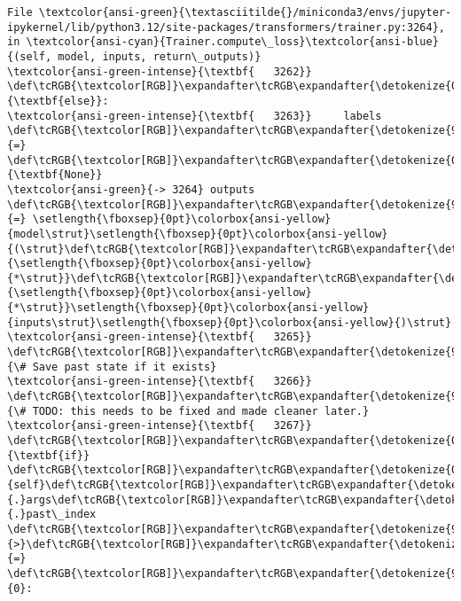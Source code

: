 \documentclass[11pt]{article}
\begin{document}
\begin{Verbatim}[commandchars=\\\{\}, frame=single, framerule=2mm, rulecolor=\color{outerrorbackground}]
File \textcolor{ansi-green}{\textasciitilde{}/miniconda3/envs/jupyter-ipykernel/lib/python3.12/site-packages/transformers/trainer.py:3264}, in \textcolor{ansi-cyan}{Trainer.compute\_loss}\textcolor{ansi-blue}{(self, model, inputs, return\_outputs)}
\textcolor{ansi-green-intense}{\textbf{   3262}} \def\tcRGB{\textcolor[RGB]}\expandafter\tcRGB\expandafter{\detokenize{0,135,0}}{\textbf{else}}:
\textcolor{ansi-green-intense}{\textbf{   3263}}     labels \def\tcRGB{\textcolor[RGB]}\expandafter\tcRGB\expandafter{\detokenize{98,98,98}}{=} \def\tcRGB{\textcolor[RGB]}\expandafter\tcRGB\expandafter{\detokenize{0,135,0}}{\textbf{None}}
\textcolor{ansi-green}{-> 3264} outputs \def\tcRGB{\textcolor[RGB]}\expandafter\tcRGB\expandafter{\detokenize{98,98,98}}{=} \setlength{\fboxsep}{0pt}\colorbox{ansi-yellow}{model\strut}\setlength{\fboxsep}{0pt}\colorbox{ansi-yellow}{(\strut}\def\tcRGB{\textcolor[RGB]}\expandafter\tcRGB\expandafter{\detokenize{98,98,98}}{\setlength{\fboxsep}{0pt}\colorbox{ansi-yellow}{*\strut}}\def\tcRGB{\textcolor[RGB]}\expandafter\tcRGB\expandafter{\detokenize{98,98,98}}{\setlength{\fboxsep}{0pt}\colorbox{ansi-yellow}{*\strut}}\setlength{\fboxsep}{0pt}\colorbox{ansi-yellow}{inputs\strut}\setlength{\fboxsep}{0pt}\colorbox{ansi-yellow}{)\strut}
\textcolor{ansi-green-intense}{\textbf{   3265}} \def\tcRGB{\textcolor[RGB]}\expandafter\tcRGB\expandafter{\detokenize{95,135,135}}{\# Save past state if it exists}
\textcolor{ansi-green-intense}{\textbf{   3266}} \def\tcRGB{\textcolor[RGB]}\expandafter\tcRGB\expandafter{\detokenize{95,135,135}}{\# TODO: this needs to be fixed and made cleaner later.}
\textcolor{ansi-green-intense}{\textbf{   3267}} \def\tcRGB{\textcolor[RGB]}\expandafter\tcRGB\expandafter{\detokenize{0,135,0}}{\textbf{if}} \def\tcRGB{\textcolor[RGB]}\expandafter\tcRGB\expandafter{\detokenize{0,135,0}}{self}\def\tcRGB{\textcolor[RGB]}\expandafter\tcRGB\expandafter{\detokenize{98,98,98}}{.}args\def\tcRGB{\textcolor[RGB]}\expandafter\tcRGB\expandafter{\detokenize{98,98,98}}{.}past\_index \def\tcRGB{\textcolor[RGB]}\expandafter\tcRGB\expandafter{\detokenize{98,98,98}}{>}\def\tcRGB{\textcolor[RGB]}\expandafter\tcRGB\expandafter{\detokenize{98,98,98}}{=} \def\tcRGB{\textcolor[RGB]}\expandafter\tcRGB\expandafter{\detokenize{98,98,98}}{0}:


\end{Verbatim}
\end{document}
